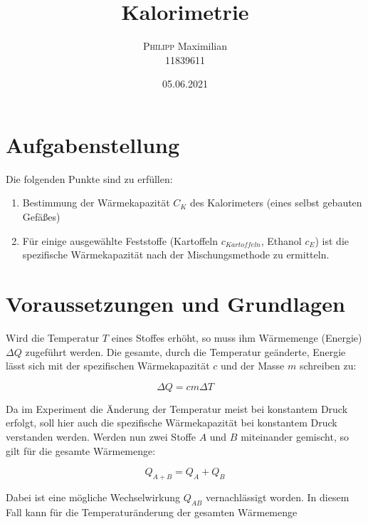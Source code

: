 \documentclass[11pt, ngerman]{scrartcl}
\begin{document}
\title{Kalorimetrie}
\author{\textsc{Philipp} Maximilian\\11839611}
\date{05.06.2021}
\maketitle

\tableofcontents
\newpage
\section{Aufgabenstellung}
\label{sec:aufgabenstellung}

Die folgenden Punkte sind zu erfüllen:

\begin{enumerate}
    \item Bestimmung der Wärmekapazität $C_K$ des Kalorimeters (eines selbst gebauten Gefäßes)
    \item Für einige ausgewählte Feststoffe (Kartoffeln $c_{Kartoffeln}$, Ethanol $c_{E}$) 
        ist die spezifische Wärmekapazität nach der Mischungsmethode zu ermitteln.
\end{enumerate}

\section{Voraussetzungen und Grundlagen}
\label{sec:voraussetzungen_grundlagen}

Wird die Temperatur $T$ eines Stoffes erhöht, so muss ihm Wärmemenge (Energie) $\Delta Q$
zugeführt werden. Die gesamte, durch die Temperatur geänderte, Energie lässt sich mit der
spezifischen Wärmekapazität $c$ und der Masse $m$ schreiben zu:

\begin{equation}
    \Delta Q = cm \Delta T
\end{equation}

Da im Experiment die Änderung der Temperatur meist bei konstantem Druck erfolgt, soll hier auch die spezifische Wärmekapazität bei konstantem Druck verstanden werden. Werden nun
zwei Stoffe $A$ und $B$ miteinander gemischt, so gilt für die gesamte Wärmemenge:

\begin{equation}
    Q_{A+B} = Q_A + Q_{B}
\end{equation}

Dabei ist eine mögliche Wechselwirkung $Q_{AB}$ vernachlässigt worden. In diesem Fall kann für
die Temperaturänderung der gesamten Wärmemenge 
\end{document}
